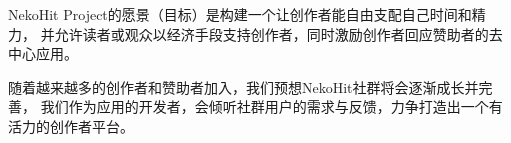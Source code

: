 NekoHit Project的愿景（目标）是构建一个让创作者能自由支配自己时间和精力，
并允许读者或观众以经济手段支持创作者，同时激励创作者回应赞助者的去中心应用。

随着越来越多的创作者和赞助者加入，我们预想NekoHit社群将会逐渐成长并完善，
我们作为应用的开发者，会倾听社群用户的需求与反馈，力争打造出一个有活力的创作者平台。